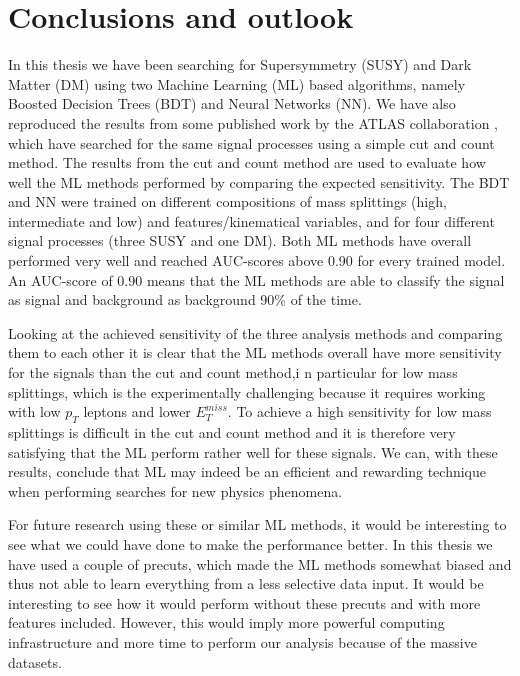 \chapter{Conclusions and outlook}

\label{sec:Conclusion}

In this thesis we have been searching for Supersymmetry (SUSY) and Dark Matter (DM) using two Machine Learning (ML) based algorithms, namely Boosted Decision Trees (BDT) and Neural Networks (NN). We have also reproduced the results from some published work by the ATLAS collaboration \cite{sleptonexclusion, monoZexclusion}, which have searched for the same signal processes using a simple cut and count method. The results from the cut and count method are used to evaluate how well the ML methods performed by comparing the expected sensitivity. The BDT and NN were trained on different compositions of mass splittings (high, intermediate and low) and features/kinematical variables, and for four different signal processes (three SUSY and one DM). Both ML methods have overall performed very well and reached AUC-scores above 0.90 for every trained model. An AUC-score of 0.90 means that the ML methods are able to classify the signal as signal and background as background 90\% of the time. 

Looking at the achieved sensitivity of the three analysis methods and comparing them to each other it is clear that the ML methods overall have more sensitivity for the signals than the cut and count method,i n particular for low mass splittings, which is the experimentally challenging because it requires working with low $p_T$ leptons and lower $E_T^{miss}$. To achieve a high sensitivity for low mass splittings is difficult in the cut and count method and it is therefore very satisfying that the ML perform rather well for these signals. We can, with these results, conclude that ML may indeed be an efficient and rewarding technique when performing searches for new physics phenomena. 

For future research using these or similar ML methods, it would be interesting to see what we could have done to make the performance better. In this thesis we have used a couple of precuts, which made the ML methods somewhat biased and thus not able to learn everything from a less selective data input. It would be interesting to see how it would perform without these precuts and with more features included. However, this would imply more powerful computing infrastructure and more time to perform our analysis because of the massive datasets. 


